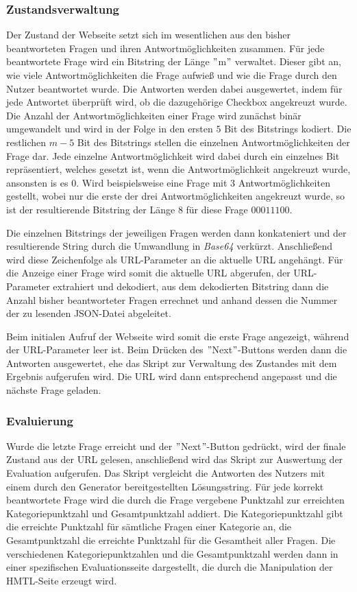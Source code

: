 \subsubsection{Zustandsverwaltung}

Der Zustand der Webseite setzt sich im wesentlichen aus den bisher beantworteten Fragen und ihren Antwortmöglichkeiten zusammen. Für jede beantwortete Frage wird ein Bitstring der Länge $"$m$"$ verwaltet. Dieser gibt an, wie viele Antwortmöglichkeiten die Frage aufwieß und wie die Frage durch den Nutzer beantwortet wurde. Die Antworten werden dabei ausgewertet, indem für jede Antwortet überprüft wird, ob die dazugehörige Checkbox angekreuzt wurde. Die Anzahl der Antwortmöglichkeiten einer Frage wird zunächst binär umgewandelt und wird in der Folge in den ersten $5$ Bit des Bitstrings kodiert. Die restlichen $m - 5$ Bit des Bitstrings stellen die einzelnen Antwortmöglichkeiten der Frage dar. Jede einzelne Antwortmöglichkeit wird dabei durch ein einzelnes Bit repräsentiert, welches gesetzt ist, wenn die Antwortmöglichkeit angekreuzt wurde, ansonsten is es $0$. Wird beispielsweise eine Frage mit $3$ Antwortmöglichkeiten gestellt, wobei nur die erste der drei Antwortmöglichkeiten angekreuzt wurde, so ist der resultierende Bitstring der Länge $8$ für diese Frage $00011100$.


Die einzelnen Bitstrings der jeweiligen Fragen werden dann konkateniert und der resultierende String durch die Umwandlung in \textit{Base64} verkürzt. Anschließend wird diese Zeichenfolge als URL-Parameter an die aktuelle URL angehängt. Für die Anzeige einer Frage wird somit die aktuelle URL abgerufen, der URL-Parameter extrahiert und dekodiert, aus dem dekodierten Bitstring dann die Anzahl bisher beantworteter Fragen errechnet und anhand dessen die Nummer der zu lesenden JSON-Datei abgeleitet.

Beim initialen Aufruf der Webseite wird somit die erste Frage angezeigt, während der URL-Parameter leer ist. Beim Drücken des $"$Next$"$-Buttons werden dann die Antworten ausgewertet, ehe das Skript zur Verwaltung des Zustandes mit dem Ergebnis aufgerufen wird. Die URL wird dann entsprechend angepasst und die nächste Frage geladen.

\subsubsection{Evaluierung}

Wurde die letzte Frage erreicht und der $"$Next$"$-Button gedrückt, wird der finale Zustand aus der URL gelesen, anschließend wird das Skript zur Auswertung der Evaluation aufgerufen. Das Skript vergleicht die Antworten des Nutzers mit einem durch den Generator bereitgestellten Lösungsstring. Für jede korrekt beantwortete Frage wird die durch die Frage vergebene Punktzahl zur erreichten Kategoriepunktzahl und Gesamtpunktzahl addiert. Die Kategoriepunktzahl gibt die erreichte Punktzahl für sämtliche Fragen einer Kategorie an, die Gesamtpunktzahl die erreichte Punktzahl für die Gesamtheit aller Fragen. Die verschiedenen Kategoriepunktzahlen und die Gesamtpunktzahl werden dann in einer spezifischen Evaluationsseite dargestellt, die durch die Manipulation der HMTL-Seite erzeugt wird. 

